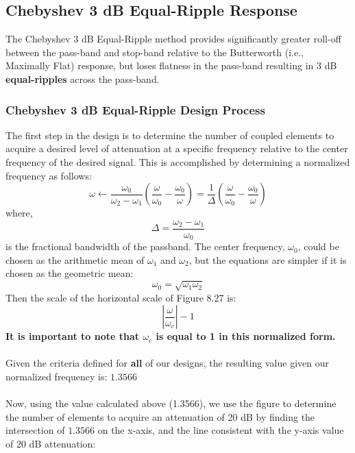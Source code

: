 \documentclass{article}
\begin{document}
\subsection{Chebyshev 3 dB Equal-Ripple Response}
The Chebyshev 3 dB Equal-Ripple method provides significantly greater roll-off between the pass-band and stop-band relative to the Butterworth (i.e., Maximally Flat) response, but loses flatness in the pass-band resulting in 3 dB \textbf{equal-ripples} across the pass-band.
\subsubsection{Chebyshev 3 dB Equal-Ripple Design Process}
The first step in the design is to determine the number of coupled elements to acquire a desired level of attenuation at a specific frequency relative to the center frequency of the desired signal. This is accomplished by determining a normalized frequency as follows:
\begin{equation}
    \omega \leftarrow \dfrac{\omega_0}{\omega_2 - \omega_1} \left( \dfrac{\omega}{\omega_0} - \dfrac{\omega_0}{\omega} \right) = \dfrac{1}{\Delta} \left( \dfrac{\omega}{\omega_0} - \dfrac{\omega_0}{\omega} \right)
\end{equation}
where,\\
\begin{equation}
    \Delta = \dfrac{\omega_2 - \omega_1}{\omega_0}
\end{equation}
is the fractional bandwidth of the passband. The center frequency, $\omega_0$, could be chosen as the arithmetic mean of $\omega_1$ and $\omega_2$, but the equations are simpler if it is chosen as the geometric mean:
\begin{equation}
    \omega_0 = \sqrt{\omega_1 \omega_2}
\end{equation}
Then the scale of the horizontal scale of Figure 8.27 is:
\begin{equation}
    \left| \dfrac{\omega}{\omega_c} \right| - 1
\end{equation}
\textbf{It is important to note that $\omega_c$ is equal to 1 in this normalized form.}\cite{Pozar}\\
\textbf{ }\\
Given the criteria defined for \textbf{all} of our designs, the resulting value given our normalized frequency is: $1.3566$\\
\text{ }\\
Now, using the value calculated above (1.3566), we use the figure to determine the number of elements to acquire an attenuation of 20 dB by finding the intersection of $1.3566$ on the x-axis, and the line consistent with the y-axis value of 20 dB attenuation:
\end{document}
